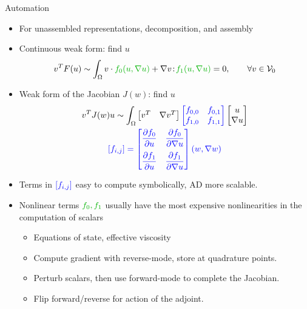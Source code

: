 \documentclass{beamer}
\begin{document}
\begin{frame}[shrink=5]{Automation}
  \begin{itemize}
  \item For unassembled representations, decomposition, and assembly
  \item Continuous weak form: find $u$
    \[ v^T F(u) \sim \int_\Omega v \cdot {\color{green!70!black} f_0(u,\nabla u)}
    + \nabla v \tcolon {\color{green!70!black} f_1(u,\nabla u)} = 0, \qquad \forall v \in \VV_0 \]
  \item Weak form of the Jacobian $J(w)$: find $u$
    \begin{gather*}
      v^T J(w) u \sim \int_\Omega \begin{bmatrix} v^T & \nabla v^T \end{bmatrix}
      {\color{blue} \begin{bmatrix} f_{0,0} & f_{0,1} \\ f_{1,0} & f_{1,1} \end{bmatrix}}
      \begin{bmatrix} u \\ \nabla u \end{bmatrix} \\
      {\color{blue} [f_{i,j}] = \begin{bmatrix} \dfrac{\partial f_0}{\partial u} & \dfrac{\partial f_0}{\partial \nabla u} \\[1em]
          \dfrac{\partial f_1}{\partial u} & \dfrac{\partial f_1}{\partial \nabla u} \end{bmatrix} (w,\nabla w) }
    \end{gather*}
  \item Terms in ${\color{blue} [f_{i,j}]}$ easy to compute symbolically, AD more scalable.
  \item Nonlinear terms ${\color{green!70!black}f_0,f_1}$ usually have the most expensive nonlinearities in the computation of scalars
    \begin{itemize}
    \item Equations of state, effective viscosity
    \item Compute gradient with reverse-mode, store at quadrature points.
    \item Perturb scalars, then use forward-mode to complete the Jacobian.
    \item Flip forward/reverse for action of the adjoint.
    \end{itemize}
  \end{itemize}
\end{frame}
\end{document}
